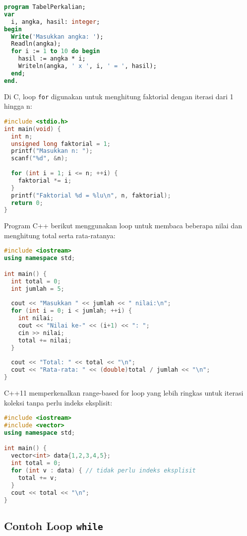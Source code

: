 \documentclass[../main.tex]{subfiles}
\begin{document}
\begin{lstlisting}[language=Pascal, caption={Cetak tabel perkalian dengan for (Pascal)}]
program TabelPerkalian;
var
  i, angka, hasil: integer;
begin
  Write('Masukkan angka: ');
  Readln(angka);
  for i := 1 to 10 do begin
    hasil := angka * i;
    Writeln(angka, ' x ', i, ' = ', hasil);
  end;
end.
\end{lstlisting}

Di C, loop \texttt{for} digunakan untuk menghitung faktorial dengan iterasi dari 1 hingga n:

\begin{lstlisting}[language=C, caption={Hitung faktorial dengan for (C)}]
#include <stdio.h>
int main(void) {
  int n;
  unsigned long faktorial = 1;
  printf("Masukkan n: ");
  scanf("%d", &n);
  
  for (int i = 1; i <= n; ++i) {
    faktorial *= i;
  }
  printf("Faktorial %d = %lu\n", n, faktorial);
  return 0;
}
\end{lstlisting}

Program C++ berikut menggunakan loop untuk membaca beberapa nilai dan menghitung total serta rata-ratanya:

\begin{lstlisting}[language=C++, caption={Loop for dengan hitung total (C++)}]
#include <iostream>
using namespace std;

int main() {
  int total = 0;
  int jumlah = 5;
  
  cout << "Masukkan " << jumlah << " nilai:\n";
  for (int i = 0; i < jumlah; ++i) {
    int nilai;
    cout << "Nilai ke-" << (i+1) << ": ";
    cin >> nilai;
    total += nilai;
  }
  
  cout << "Total: " << total << "\n";
  cout << "Rata-rata: " << (double)total / jumlah << "\n";
}
\end{lstlisting}

C++11 memperkenalkan range-based for loop yang lebih ringkas untuk iterasi koleksi tanpa perlu indeks eksplisit:

\begin{lstlisting}[language=C++, caption={Range-based for pada koleksi (C++11+)}]
#include <iostream>
#include <vector>
using namespace std;

int main() {
  vector<int> data{1,2,3,4,5};
  int total = 0;
  for (int v : data) { // tidak perlu indeks eksplisit
    total += v;
  }
  cout << total << "\n";
}
\end{lstlisting}

\subsection{Contoh Loop \texttt{while}}
\end{document}
